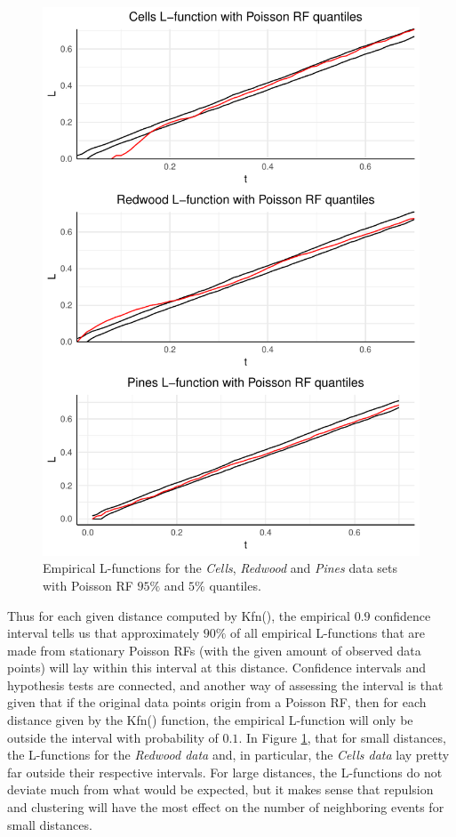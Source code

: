 \begin{figure}
    \centering
    \includegraphics[scale=0.95]{figures/prob1_quantiles.pdf}
    \caption{Empirical L-functions for the \textit{Cells}, \textit{Redwood} and \textit{Pines} data sets with Poisson RF $95\%$ and $5\%$ quantiles.}
    \label{fig:poiss_quantiles}
\end{figure}

Thus for each given distance computed by Kfn(), the empirical $0.9$ confidence interval tells us that approximately $90\%$ of all empirical L-functions that are made from stationary Poisson RFs (with the given amount of observed data points) will lay within this interval at this distance. Confidence intervals and hypothesis tests are connected, and another way of assessing the interval is that given that if the original data points origin from a Poisson RF, then for each distance given by the Kfn() function, the empirical L-function will only be outside the interval with probability of $0.1$. In Figure \ref{fig:poiss_quantiles}, that for small distances, the L-functions for the \textit{Redwood data} and, in particular, the \textit{Cells data} lay pretty far outside their respective intervals. For large distances, the L-functions do not deviate much from what would be expected, but it makes sense that repulsion and clustering will have the most effect on the number of neighboring events for small distances.

